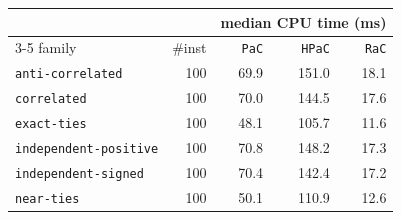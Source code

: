 \begin{tabular}{@{}lrrrr@{}}
\toprule
 &  & \multicolumn{3}{c}{median CPU time (ms)} \\
\cmidrule(l){3-5}
family & \#inst & \texttt{PaC} & \texttt{HPaC} & \texttt{RaC} \\
\midrule
\texttt{anti-correlated} & 100 & 69.9 & 151.0 & 18.1 \\
\texttt{correlated} & 100 & 70.0 & 144.5 & 17.6 \\
\texttt{exact-ties} & 100 & 48.1 & 105.7 & 11.6 \\
\texttt{independent-positive} & 100 & 70.8 & 148.2 & 17.3 \\
\texttt{independent-signed} & 100 & 70.4 & 142.4 & 17.2 \\
\texttt{near-ties} & 100 & 50.1 & 110.9 & 12.6 \\
\bottomrule
\end{tabular}
